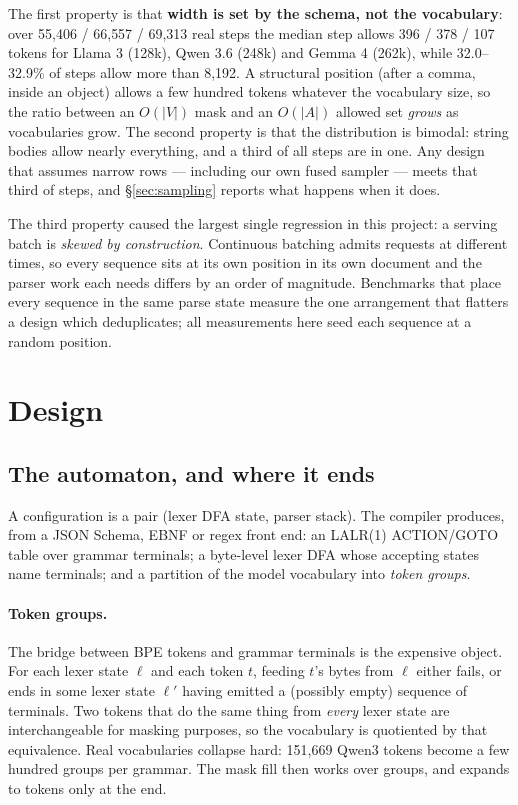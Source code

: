 \documentclass{article}
\begin{document}
The first property is that \textbf{width is set by the schema, not the
vocabulary}: over 55{,}406 / 66{,}557 / 69{,}313 real steps the median step
allows 396 / 378 / 107 tokens for Llama 3 (128k), Qwen 3.6 (248k) and Gemma 4
(262k), while 32.0--32.9\% of steps allow more than 8{,}192. A structural position (after a comma, inside an
object) allows a few hundred tokens whatever the vocabulary size, so the ratio
between an $O(|V|)$ mask and an $O(|A|)$ allowed set \emph{grows} as vocabularies
grow. The second property is that the distribution is bimodal: string bodies
allow nearly everything, and a third of all steps are in one. Any design that
assumes narrow rows --- including our own fused sampler --- meets that third of
steps, and \S\ref{sec:sampling} reports what happens when it does.

The third property caused the largest single regression in this project: a
serving batch is \emph{skewed by construction}. Continuous batching admits
requests at different times, so every sequence sits at its own position in its
own document and the parser work each needs differs by an order of magnitude.
Benchmarks that place every sequence in the same parse state measure the one
arrangement that flatters a design which deduplicates; all measurements here
seed each sequence at a random position.

\section{Design}
\label{sec:design}

\subsection{The automaton, and where it ends}
\label{sec:automaton}

A configuration is a pair (lexer DFA state, parser stack). The compiler produces,
from a JSON Schema, EBNF or regex front end: an LALR(1) ACTION/GOTO table over
grammar terminals; a byte-level lexer DFA whose accepting states name terminals;
and a partition of the model vocabulary into \emph{token groups}.

\paragraph{Token groups.} The bridge between BPE tokens and grammar terminals is
the expensive object. For each lexer state $\ell$ and each token $t$, feeding
$t$'s bytes from $\ell$ either fails, or ends in some lexer state $\ell'$ having
emitted a (possibly empty) sequence of terminals. Two tokens that do the same
thing from \emph{every} lexer state are interchangeable for masking purposes, so
the vocabulary is quotiented by that equivalence. Real vocabularies collapse
hard: 151{,}669 Qwen3 tokens become a few hundred groups per grammar. The mask
fill then works over groups, and expands to tokens only at the end.
\end{document}
